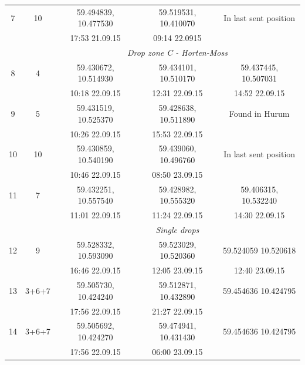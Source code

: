 \documentclass[12pt,a4paper,english]{article}
\begin{document}
\begin{table}[tb]
\begin{tabular}{|c|cccc|}
        7    & 10      & 59.494839, 10.477530 & 59.519531, 10.410070    & In last sent position      \\
             &         & 17:53 21.09.15       & 09:14 22.0915           &                            \\ \hline 
             &         &          \multicolumn{3}{c}{\textit{Drop zone C - Horten-Moss}}             \\
        8    & 4       & 59.430672, 10.514930 & 59.434101, 10.510170    & 59.437445, 10.507031       \\
             &         & 10:18 22.09.15       & 12:31 22.09.15          & 14:52 22.09.15             \\
        9    & 5       & 59.431519, 10.525370 & 59.428638, 10.511890    & Found in Hurum             \\
             &         & 10:26 22.09.15       & 15:53 22.09.15          &                            \\
        10   & 10      & 59.430859, 10.540190 & 59.439060, 10.496760    & In last sent position      \\
             &         & 10:46 22.09.15	      & 08:50 23.09.15          &                            \\
        11   & 7       & 59.432251, 10.557540 & 59.428982, 10.555320    & 59.406315, 10.532240       \\
             &         & 11:01 22.09.15       & 11:24 22.09.15          & 14:30 22.09.15             \\ \hline 
             &         &          \multicolumn{3}{c}{\textit{Single drops}}                          \\
        12   & 9       & 59.528332, 10.593090 & 59.523029, 10.520360    & 59.524059 10.520618        \\
             &         & 16:46 22.09.15       & 12:05 23.09.15          & 12:40 23.09.15             \\
        13   & 3+6+7   & 59.505730, 10.424240 & 59.512871,  10.432890   & 59.454636 10.424795        \\
             &         & 17:56 22.09.15       & 21:27 22.09.15          &                            \\
        14   & 3+6+7   & 59.505692, 10.424270 & 59.474941, 10.431430    & 59.454636 10.424795        \\
             &         & 17:56 22.09.15       & 06:00 23.09.15          &                            \\ 
\hline 
\end{tabular}
\end{table}
\clearpage
\end{document}
